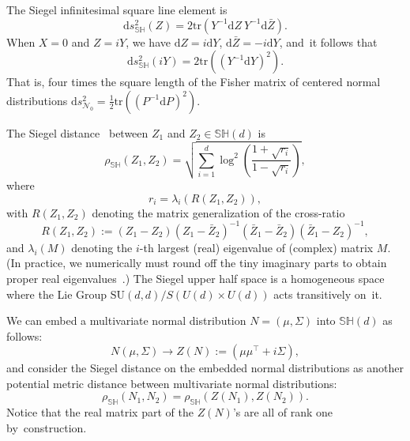 \documentclass[entropy,article,accept,oneauthor,pdftex,entropy]{Definitions/mdpi}
\def\SH{\mathbb{SH}}
\def\dZ{\mathrm{d}Z}
\def\dY{\mathrm{d}Y}
\def\dP{\mathrm{d}P}
\def\dZbar{\mathrm{d}\bar Z}
\def\barZ{{\bar{Z}}}
\def\dP{\mathrm{d}P}
\def\tr{\mathrm{tr}}
\def\calN{\mathcal{N}}
\def\ds{\mathrm{d}s}
\begin{document}
The Siegel infinitesimal square line element is
\begin{equation}
\ds_\SH^2 (Z) = 2 \tr\left(Y^{-1}\dZ\ Y^{-1}\dZbar\right).
\end{equation}
When $X=0$ and $Z=iY$, we have $\dZ=i\dY$, $\dZbar=-i\dY$,  and~it follows that
$$
\ds_\SH^2 (iY)=2 \tr\left( (Y^{-1}\dY)^2\right).
$$
That is, four times the square length of the Fisher matrix of centered normal distributions 
$\ds^2_{\calN_0}=\frac{1}{2}\tr \left( (P^{-1}\dP)^2\right)$.

The  Siegel  distance~\cite{siegel2014symplectic} between $Z_1$ and $Z_2\in\SH(d)$ is
\begin{equation}\label{eq:SiegelDistance}
\rho_\SH(Z_1,Z_2) = \sqrt{\sum_{i=1}^d \log^2\left(\frac{1+\sqrt{r_i}}{1-\sqrt{r_i}}\right)},
\end{equation}
where
\begin{equation}
r_i=\lambda_i\left(R(Z_1,Z_2)\right),
\end{equation}
with $R(Z_1,Z_2)$ denoting  the matrix generalization of the {cross-ratio}
\begin{equation}\label{eq:matrixcr}
R(Z_1,Z_2)  := (Z_1-Z_2)(Z_1-\barZ_2)^{-1} (\barZ_1 -\barZ_2) (\barZ_1 -Z_2)^{-1},
\end{equation}
and $\lambda_i(M)$ denoting the $i$-th largest (real) eigenvalue of (complex) matrix $M$.
(In practice, we numerically must round off the tiny imaginary parts to obtain proper real eigenvalues~\cite{nielsen2020siegel}.)
The Siegel upper half space is a homogeneous space where the Lie Group $\mathrm{SU}(d,d)/S(U(d)\times U(d))$  acts transitively on~it.

 
We can embed a multivariate normal distribution $N=(\mu,\Sigma)$ into $\SH(d)$ as follows:
$$
N(\mu,\Sigma)\rightarrow Z(N):=\left(\mu\mu^\top+i\Sigma\right),
$$
and consider the Siegel distance on the embedded normal distributions as another potential metric distance between multivariate normal distributions:
\begin{equation}
\rho_\SH(N_1,N_2)=\rho_\SH(Z(N_1),Z(N_2)).
\end{equation}
Notice that the real matrix part of the $Z(N)$'s are all of rank one by~construction. 
\end{document}

